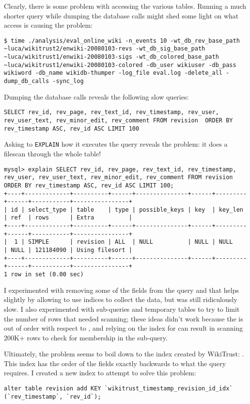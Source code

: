 Clearly, there is some problem with \mysql accessing the
various tables.
Running a much shorter query while dumping the database calls
might shed some light on what access is causing the problem:
\begin{verbatim}
$ time ./analysis/eval_online_wiki -n_events 10 -wt_db_rev_base_path ~luca/wikitrust2/enwiki-20080103-revs -wt_db_sig_base_path ~luca/wikitrust1/enwiki-20080103-sigs -wt_db_colored_base_path ~luca/wikitrust1/enwiki-20080103-colored -db_user wikiuser -db_pass wikiword -db_name wikidb-thumper -log_file eval.log -delete_all -dump_db_calls -sync_log
\end{verbatim}
Dumping the database calls reveals the following slow queries:
\begin{verbatim}
SELECT rev_id, rev_page, rev_text_id, rev_timestamp, rev_user, rev_user_text, rev_minor_edit, rev_comment FROM revision  ORDER BY rev_timestamp ASC, rev_id ASC LIMIT 100
\end{verbatim}

Asking \mysql to \texttt{EXPLAIN} how it executes the query
reveals the problem: it does a filescan through the whole table!
\begin{verbatim}
mysql> explain SELECT rev_id, rev_page, rev_text_id, rev_timestamp, rev_user, rev_user_text, rev_minor_edit, rev_comment FROM revision  ORDER BY rev_timestamp ASC, rev_id ASC LIMIT 100;
+----+-------------+----------+------+---------------+------+---------+------+-----------+----------------+
| id | select_type | table    | type | possible_keys | key  | key_len | ref  | rows      | Extra          |
+----+-------------+----------+------+---------------+------+---------+------+-----------+----------------+
|  1 | SIMPLE      | revision | ALL  | NULL          | NULL | NULL    | NULL | 121184090 | Using filesort |
+----+-------------+----------+------+---------------+------+---------+------+-----------+----------------+
1 row in set (0.00 sec)
\end{verbatim}
I experimented with removing some of the fields from the query
and that helps slightly by allowing \mysql to use indices to
collect the data, but was still ridiculously slow.
I also experimented with sub-queries and temporary tables
to try to limit the number of rows that needed scanning;
these ideas didn't work because the  is out
of order with respect to , and relying
on the index for  can result in scanning
200K+ rows to check for membership in the sub-query.

Ultimately, the problem seems to boil down to the index
created by WikiTrust: .
This index has the order of the fields exactly backwards
to what the query requires.
I created a new index to attempt to solve this problem:
\begin{verbatim}
alter table revision add KEY `wikitrust_timestamp_revision_id_idx` (`rev_timestamp`, `rev_id`);
\end{verbatim}


